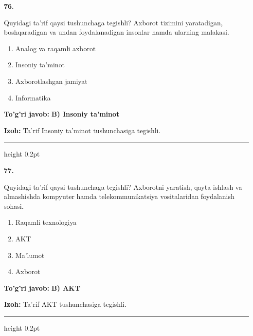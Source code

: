 \documentclass[10pt,a4paper,oneside]{article}
\begin{document}
\noindent\textbf{\color{ink}76.}
\par
Quyidagi ta'rif qaysi tushunchaga tegishli? Axborot tizimini yaratadigan, boshqaradigan va undan foydalanadigan insonlar hamda ularning malakasi.
\begin{enumerate}[label=\Alph*),leftmargin=9mm]
\item Analog va raqamli axborot
\item Insoniy ta'minot
\item Axborotlashgan jamiyat
\item Informatika
\end{enumerate}
\begin{tcolorbox}[enhanced,breakable,colback=teal!4,colframe=teal!50!black,boxrule=0.5pt,arc=1.1mm,left=3mm,right=3mm,top=1.7mm,bottom=1.7mm,before skip=2mm,after skip=2mm]
\textbf{\color{teal}To'g'ri javob:} \textbf{B) Insoniy ta'minot}
\par\smallskip
\textbf{Izoh:} Ta'rif Insoniy ta'minot tushunchasiga tegishli.
\end{tcolorbox}
\vspace{2mm}\hrule height 0.2pt \vspace{3mm}

\noindent\textbf{\color{ink}77.}
\par
Quyidagi ta'rif qaysi tushunchaga tegishli? Axborotni yaratish, qayta ishlash va almashishda kompyuter hamda telekommunikatsiya vositalaridan foydalanish sohasi.
\begin{enumerate}[label=\Alph*),leftmargin=9mm]
\item Raqamli texnologiya
\item AKT
\item Ma'lumot
\item Axborot
\end{enumerate}
\begin{tcolorbox}[enhanced,breakable,colback=teal!4,colframe=teal!50!black,boxrule=0.5pt,arc=1.1mm,left=3mm,right=3mm,top=1.7mm,bottom=1.7mm,before skip=2mm,after skip=2mm]
\textbf{\color{teal}To'g'ri javob:} \textbf{B) AKT}
\par\smallskip
\textbf{Izoh:} Ta'rif AKT tushunchasiga tegishli.
\end{tcolorbox}
\vspace{2mm}\hrule height 0.2pt \vspace{3mm}
\end{document}
